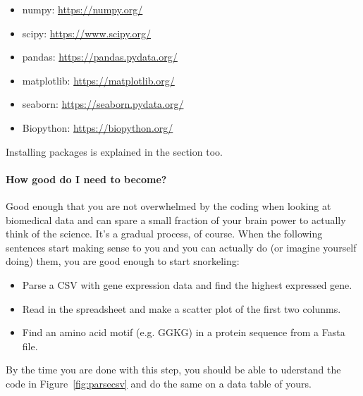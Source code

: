 \documentclass[12pt,a4paper,notitlepage,onecolumn]{article}
\begin{document}
\begin{itemize}
\item numpy: \url{https://numpy.org/}
\item scipy: \url{https://www.scipy.org/}
\item pandas: \url{https://pandas.pydata.org/}
\item matplotlib: \url{https://matplotlib.org/}
\item seaborn: \url{https://seaborn.pydata.org/}
\item Biopython: \url{https://biopython.org/}
\end{itemize}

Installing packages is explained in the  section too.

\paragraph{How good do I need to become?} Good enough that you are not overwhelmed by the coding when looking at biomedical data and can spare a small fraction of your brain power to actually think of the science. It's a gradual process, of course. When the following sentences start making sense to you and you can actually do (or imagine yourself doing) them, you are good enough to start snorkeling:

\begin{itemize}
\item Parse a CSV with gene expression data and find the highest expressed gene.
\item Read in the spreadsheet and make a scatter plot of the first two colunms.
\item Find an amino acid motif (e.g. GGKG) in a protein sequence from a Fasta file.
\end{itemize}

By the time you are done with this step, you should be able to uderstand the code in Figure~\ref{fig:parsecsv} and do the same on a data table of yours.
\end{document}

